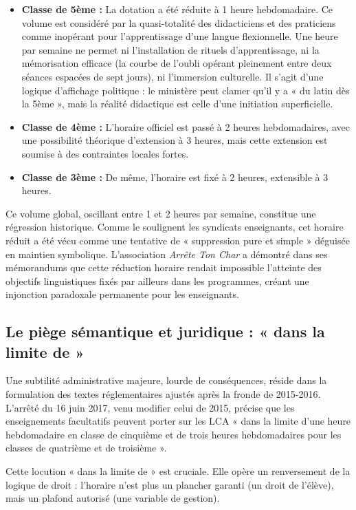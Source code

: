 \begin{itemize}\item \textbf{Classe de 5ème :} La dotation a été réduite à 1 heure hebdomadaire.\cite{I-3-2-ref1} Ce volume est considéré par la quasi-totalité des didacticiens et des praticiens comme inopérant pour l'apprentissage d'une langue flexionnelle. Une heure par semaine ne permet ni l'installation de rituels d'apprentissage, ni la mémorisation efficace (la courbe de l'oubli opérant pleinement entre deux séances espacées de sept jours), ni l'immersion culturelle. Il s'agit d'une logique d'affichage politique : le ministère peut clamer qu'il y a « du latin dès la 5ème », mais la réalité didactique est celle d'une initiation superficielle.\item \textbf{Classe de 4ème :} L'horaire officiel est passé à 2 heures hebdomadaires, avec une possibilité théorique d'extension à 3 heures, mais cette extension est soumise à des contraintes locales fortes.\cite{I-3-2-ref1}\item \textbf{Classe de 3ème :} De même, l'horaire est fixé à 2 heures, extensible à 3 heures.\cite{I-3-2-ref1}\end{itemize}Ce volume global, oscillant entre 1 et 2 heures par semaine, constitue une régression historique.
Comme le soulignent les syndicats enseignants, cet horaire réduit a été vécu comme une tentative de
« suppression pure et simple » déguisée en maintien symbolique.\cite{I-3-2-ref1} L'association
\textit{Arrête Ton Char} a démontré dans ses mémorandums que cette réduction horaire rendait
impossible l'atteinte des objectifs linguistiques fixés par ailleurs dans les programmes, créant une
injonction paradoxale permanente pour les enseignants.\cite{I-3-2-ref5}



\subsection{Le piège sémantique et juridique : « dans la limite de »}

Une subtilité administrative majeure, lourde de conséquences, réside dans la formulation des textes
réglementaires ajustés après la fronde de 2015-2016. L'arrêté du 16 juin 2017, venu modifier celui
de 2015, précise que les enseignements facultatifs peuvent porter sur les LCA « dans la limite d'une
heure hebdomadaire en classe de cinquième et de trois heures hebdomadaires pour les classes de
quatrième et de troisième ».\cite{I-3-2-ref3}

Cette locution « dans la limite de » est cruciale. Elle opère un renversement de la logique de droit
: l'horaire n'est plus un plancher garanti (un droit de l'élève), mais un plafond autorisé (une
variable de gestion).

